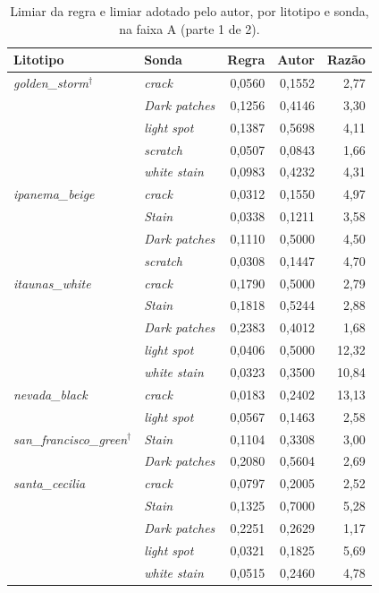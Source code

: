 \begin{table}[ht]
  \caption{Limiar da regra e limiar adotado pelo autor, por litotipo e sonda, na faixa A (parte 1 de 2).}
  \label{tab:apendice_limiares}
  \centering
  \footnotesize
  \begin{tabular}{llrrr}
    \hline
    \bfseries Litotipo & \bfseries Sonda & \bfseries Regra & \bfseries Autor & \bfseries Razão \\
    \hline
    \textit{golden\_storm}$^{\dagger}$ & \textit{crack} & 0,0560 & 0,1552 & 2,77 \\
     & \textit{Dark patches} & 0,1256 & 0,4146 & 3,30 \\
     & \textit{light spot} & 0,1387 & 0,5698 & 4,11 \\
     & \textit{scratch} & 0,0507 & 0,0843 & 1,66 \\
     & \textit{white stain} & 0,0983 & 0,4232 & 4,31 \\
    \hline
    \textit{ipanema\_beige} & \textit{crack} & 0,0312 & 0,1550 & 4,97 \\
     & \textit{Stain} & 0,0338 & 0,1211 & 3,58 \\
     & \textit{Dark patches} & 0,1110 & 0,5000 & 4,50 \\
     & \textit{scratch} & 0,0308 & 0,1447 & 4,70 \\
    \hline
    \textit{itaunas\_white} & \textit{crack} & 0,1790 & 0,5000 & 2,79 \\
     & \textit{Stain} & 0,1818 & 0,5244 & 2,88 \\
     & \textit{Dark patches} & 0,2383 & 0,4012 & 1,68 \\
     & \textit{light spot} & 0,0406 & 0,5000 & 12,32 \\
     & \textit{white stain} & 0,0323 & 0,3500 & 10,84 \\
    \hline
    \textit{nevada\_black} & \textit{crack} & 0,0183 & 0,2402 & 13,13 \\
     & \textit{light spot} & 0,0567 & 0,1463 & 2,58 \\
    \hline
    \textit{san\_francisco\_green}$^{\dagger}$ & \textit{Stain} & 0,1104 & 0,3308 & 3,00 \\
     & \textit{Dark patches} & 0,2080 & 0,5604 & 2,69 \\
    \hline
    \textit{santa\_cecilia} & \textit{crack} & 0,0797 & 0,2005 & 2,52 \\
     & \textit{Stain} & 0,1325 & 0,7000 & 5,28 \\
     & \textit{Dark patches} & 0,2251 & 0,2629 & 1,17 \\
     & \textit{light spot} & 0,0321 & 0,1825 & 5,69 \\
     & \textit{white stain} & 0,0515 & 0,2460 & 4,78 \\
    \hline
  \end{tabular}
\end{table}

